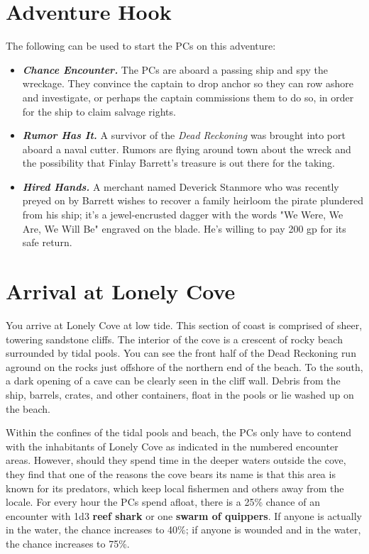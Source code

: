 \documentclass[10pt,a4paper,twoside,bg=print,twocolumn,openany,nodeprecatedcode]{dndbook}
\begin{document}
\section{Adventure Hook}
The following can be used to start the PCs on this adventure:


\begin{itemize}
\item \textbf{\textit{Chance Encounter.}} The PCs are aboard a passing ship and spy the wreckage. They convince the captain to drop anchor so they can row ashore and investigate, or perhaps the captain commissions them to do so, in order for the ship to claim salvage rights.
\item \textbf{\textit{Rumor Has It.}} A survivor of the \textit{Dead Reckoning} was brought into port aboard a naval cutter. Rumors are flying around town about the wreck and the possibility that Finlay Barrett's treasure is out there for the taking.
\item \textbf{\textit{Hired Hands.}} A merchant named Deverick Stanmore who was recently preyed on by Barrett wishes to recover a family heirloom the pirate plundered from his ship; it's a jewel-encrusted dagger with the words "We Were, We Are, We Will Be" engraved on the blade. He's willing to pay 200 gp for its safe return.
\end{itemize}

\section{Arrival at Lonely Cove}
\begin{DndReadAloud}{}
You arrive at Lonely Cove at low tide. This section of coast is comprised of sheer, towering sandstone cliffs. The interior of the cove is a crescent of rocky beach surrounded by tidal pools. You can see the front half of the Dead Reckoning run aground on the rocks just offshore of the northern end of the beach. To the south, a dark opening of a cave can be clearly seen in the cliff wall. Debris from the ship, barrels, crates, and other containers, float in the pools or lie washed up on the beach.

\end{DndReadAloud}

Within the confines of the tidal pools and beach, the PCs only have to contend with the inhabitants of Lonely Cove as indicated in the numbered encounter areas. However, should they spend time in the deeper waters outside the cove, they find that one of the reasons the cove bears its name is that this area is known for its predators, which keep local fishermen and others away from the locale. For every hour the PCs spend afloat, there is a 25\% chance of an encounter with 1d3 \textbf{reef shark} or one \textbf{swarm of quippers}. If anyone is actually in the water, the chance increases to 40\%; if anyone is wounded and in the water, the chance increases to 75\%.
\end{document}

